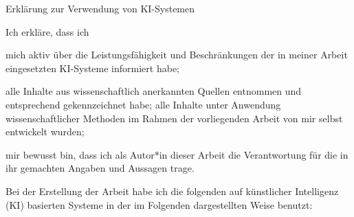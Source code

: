 {\Huge Erklärung zur Verwendung von KI-Systemen}\vspace{0.5cm}

Ich erkläre, dass ich

\begin{myitemize}
	\item mich aktiv über die Leistungsfähigkeit und Beschränkungen der in meiner Arbeit eingesetzten KI-Systeme informiert habe;
	\item alle Inhalte aus wissenschaftlich anerkannten Quellen entnommen und entsprechend gekennzeichnet habe; alle Inhalte unter Anwendung wissenschaftlicher Methoden im Rahmen der vorliegenden Arbeit von mir selbst entwickelt wurden;
	\item mir bewusst bin, dass ich als Autor*in dieser Arbeit die Verantwortung für die in ihr gemachten Angaben und Aussagen trage.
\end{myitemize}

Bei der Erstellung der Arbeit habe ich die folgenden auf künstlicher Intelligenz (KI) basierten Systeme in der
im Folgenden dargestellten Weise benutzt:

